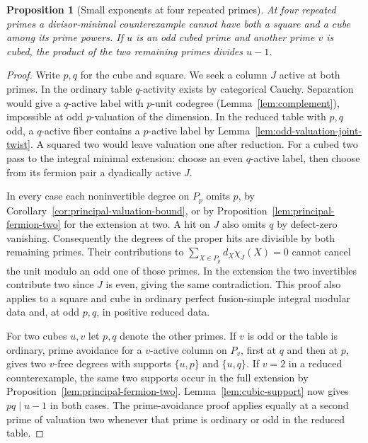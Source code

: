\documentclass[11pt,a4paper]{article}
\numberwithin{equation}{section}
\newtheorem{proposition}[theorem]{Proposition}
\theoremstyle{remark}
\begin{document}
\begin{proposition}[Small exponents at four repeated primes]\label{fam:M:10.2}\label{prop:four-cube-square}\label{cor:four-cubic-support}
At four repeated primes a divisor-minimal counterexample cannot have
both a square and a cube among its prime powers. If $u$ is an odd
cubed prime and another prime $v$ is cubed, the product of the two
remaining primes divides $u-1$.
\end{proposition}
\begin{proof}
Write $p,q$ for the cube and square. We seek a column $J$ active
at both primes. In the ordinary table $q$-activity exists by categorical Cauchy.
Separation would give a $q$-active label with $p$-unit codegree
(Lemma~\ref{lem:complement}), impossible at odd $p$-valuation of
the dimension. In the reduced table with $p,q$ odd, a $q$-active
fiber contains a $p$-active label by
Lemma~\ref{lem:odd-valuation-joint-twist}. A squared two would
leave valuation one after reduction. For a cubed two pass to the
integral minimal extension: choose an even $q$-active label, then
choose from its fermion pair a dyadically active $J$.

In every case each noninvertible degree on $P_p$ omits $p$, by
Corollary~\ref{cor:principal-valuation-bound}, or by
Proposition~\ref{lem:principal-fermion-two} for the extension at
two. A hit on $J$ also omits $q$ by defect-zero vanishing.
Consequently the degrees of the proper hits are divisible by both
remaining primes. Their contributions to
$\sum_{X\in P_p}d_X\chi_J(X)=0$ cannot cancel the unit modulo an odd
one of those primes. In the extension the two invertibles contribute
two since $J$ is even, giving the same contradiction. This proof
also applies to a square and cube in ordinary perfect fusion-simple
integral modular data and, at odd $p,q$, in positive reduced data.

For two cubes $u,v$ let $p,q$ denote the other primes. If $v$ is odd
or the table is ordinary, prime avoidance for a $v$-active column
on $P_v$, first at $q$ and then at $p$, gives two $v$-free degrees
with supports $\{u,p\}$ and $\{u,q\}$. If $v=2$ in a reduced
counterexample, the same two supports occur in the full extension
by Proposition~\ref{lem:principal-fermion-two}. Lemma~\ref{lem:cubic-support}
now gives $pq\mid u-1$ in both cases. The prime-avoidance proof
applies equally at a second prime of valuation two whenever that
prime is ordinary or odd in the reduced table.
\end{proof}
\end{document}
